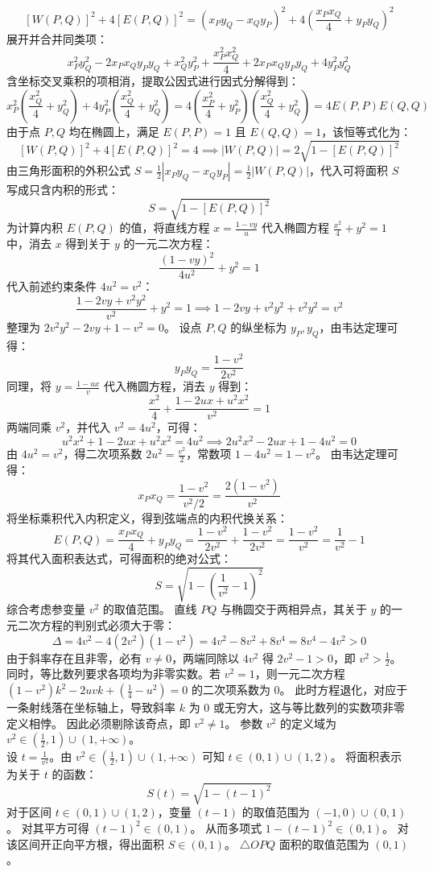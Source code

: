\begin{solution}
$$ [W(P, Q)]^2 + 4[E(P, Q)]^2 = (x_P y_Q - x_Q y_P)^2 + 4\left(\frac{x_P x_Q}{4} + y_P y_Q\right)^2 $$
展开并合并同类项：
$$ x_P^2 y_Q^2 - 2x_P x_Q y_P y_Q + x_Q^2 y_P^2 + \frac{x_P^2 x_Q^2}{4} + 2x_P x_Q y_P y_Q + 4y_P^2 y_Q^2 $$
含坐标交叉乘积的项相消，提取公因式进行因式分解得到：
$$ x_P^2\left(\frac{x_Q^2}{4} + y_Q^2\right) + 4y_P^2\left(\frac{x_Q^2}{4} + y_Q^2\right) = 4\left(\frac{x_P^2}{4} + y_P^2\right)\left(\frac{x_Q^2}{4} + y_Q^2\right) = 4E(P, P)E(Q, Q) $$
由于点 $P, Q$ 均在椭圆上，满足 $E(P, P) = 1$ 且 $E(Q, Q) = 1$，该恒等式化为：
$$ [W(P, Q)]^2 + 4[E(P, Q)]^2 = 4 \implies |W(P, Q)| = 2\sqrt{1 - [E(P, Q)]^2} $$
由三角形面积的外积公式 $S = \frac{1}{2}|x_P y_Q - x_Q y_P| = \frac{1}{2}|W(P, Q)|$，代入可将面积 $S$ 写成只含内积的形式：
$$ S = \sqrt{1 - [E(P, Q)]^2} $$
为计算内积 $E(P, Q)$ 的值，将直线方程 $x = \frac{1 - vy}{u}$ 代入椭圆方程 $\frac{x^2}{4} + y^2 = 1$ 中，消去 $x$ 得到关于 $y$ 的一元二次方程：
$$ \frac{(1 - vy)^2}{4u^2} + y^2 = 1 $$
代入前述约束条件 $4u^2 = v^2$：
$$ \frac{1 - 2vy + v^2 y^2}{v^2} + y^2 = 1 \implies 1 - 2vy + v^2 y^2 + v^2 y^2 = v^2 $$
整理为 $2v^2 y^2 - 2vy + 1 - v^2 = 0$。
设点 $P, Q$ 的纵坐标为 $y_P, y_Q$，由韦达定理可得：
$$ y_P y_Q = \frac{1 - v^2}{2v^2} $$
同理，将 $y = \frac{1 - ux}{v}$ 代入椭圆方程，消去 $y$ 得到：
$$ \frac{x^2}{4} + \frac{1 - 2ux + u^2 x^2}{v^2} = 1 $$
两端同乘 $v^2$，并代入 $v^2 = 4u^2$，可得：
$$ u^2 x^2 + 1 - 2ux + u^2 x^2 = 4u^2 \implies 2u^2 x^2 - 2ux + 1 - 4u^2 = 0 $$
由 $4u^2 = v^2$，得二次项系数 $2u^2 = \frac{v^2}{2}$，常数项 $1 - 4u^2 = 1 - v^2$。
由韦达定理可得：
$$ x_P x_Q = \frac{1 - v^2}{v^2 / 2} = \frac{2(1 - v^2)}{v^2} $$
将坐标乘积代入内积定义，得到弦端点的内积代换关系：
$$ E(P, Q) = \frac{x_P x_Q}{4} + y_P y_Q = \frac{1 - v^2}{2v^2} + \frac{1 - v^2}{2v^2} = \frac{1 - v^2}{v^2} = \frac{1}{v^2} - 1 $$
将其代入面积表达式，可得面积的绝对公式：
$$ S = \sqrt{1 - \left(\frac{1}{v^2} - 1\right)^2} $$
综合考虑参变量 $v^2$ 的取值范围。
直线 $PQ$ 与椭圆交于两相异点，其关于 $y$ 的一元二次方程的判别式必须大于零：
$$ \Delta = 4v^2 - 4(2v^2)(1 - v^2) = 4v^2 - 8v^2 + 8v^4 = 8v^4 - 4v^2 > 0 $$
由于斜率存在且非零，必有 $v \neq 0$，两端同除以 $4v^2$ 得 $2v^2 - 1 > 0$，即 $v^2 > \frac{1}{2}$。
同时，等比数列要求各项均为非零实数。若 $v^2 = 1$，则一元二次方程 $(1 - v^2)k^2 - 2uvk + \left(\frac{1}{4} - u^2\right) = 0$ 的二次项系数为 $0$。
此时方程退化，对应于一条射线落在坐标轴上，导致斜率 $k$ 为 $0$ 或无穷大，这与等比数列的实数项非零定义相悖。
因此必须剔除该奇点，即 $v^2 \neq 1$。
参数 $v^2$ 的定义域为 $v^2 \in \left(\frac{1}{2}, 1\right) \cup (1, +\infty)$。\\
设 $t = \frac{1}{v^2}$。由 $v^2 \in \left(\frac{1}{2}, 1\right) \cup (1, +\infty)$ 可知 $t \in (0, 1) \cup (1, 2)$。
将面积表示为关于 $t$ 的函数：
$$ S(t) = \sqrt{1 - (t - 1)^2} $$
对于区间 $t \in (0, 1) \cup (1, 2)$，变量 $(t - 1)$ 的取值范围为 $(-1, 0) \cup (0, 1)$。
对其平方可得 $(t - 1)^2 \in (0, 1)$。
从而多项式 $1 - (t - 1)^2 \in (0, 1)$。
对该区间开正向平方根，得出面积 $S \in (0, 1)$。
$\triangle OPQ$ 面积的取值范围为 $(0, 1)$。
\end{solution}




